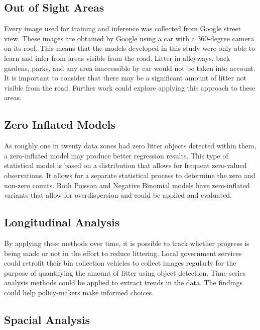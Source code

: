 \documentclass{thesis}
\begin{document}
\subsection{Out of Sight Areas}

Every image used for training and inference was collected from Google street view. These images are obtained by Google using a car with a 360-degree camera on its roof. This means that the models developed in this study were only able to learn and infer from areas visible from the road. Litter in alleyways, back gardens, parks, and any area inaccessible by car would not be taken into account. It is important to consider that there may be a significant amount of litter not visible from the road. Further work could explore applying this approach to these areas.

\subsection{Zero Inflated Models}

As roughly one in twenty data zones had zero litter objects detected within them, a zero-inflated model may produce better regression results. This type of statistical model is based on a distribution that allows for frequent zero-valued observations. It allows for a separate statistical process to determine the zero and non-zero counts. Both Poisson and Negative Binomial models have zero-inflated variants that allow for overdispersion and could be applied and evaluated.

\subsection{Longitudinal Analysis}

By applying these methods over time, it is possible to track whether progress is being made or not in the effort to reduce littering. Local government services could retrofit their bin collection vehicles to collect images regularly for the purpose of quantifying the amount of litter using object detection. Time series analysis methods could be applied to extract trends in the data. The findings could help policy-makers make informed choices.

\subsection{Spacial Analysis}
\end{document}
